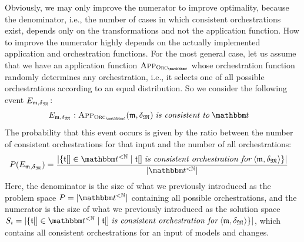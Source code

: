 Obviously, we may only improve the numerator to improve optimality, because the denominator, i.e., the number of cases in which consistent orchestrations exist, depends only on the transformations and not the application function.
How to improve the numerator highly depends on the actually implemented application and orchestration functions.
For the most general case, let us assume that we have an application function $\appfunction{\orcfunction{\transformationset{T}}}$ whose orchestration function randomly determines any orchestration, i.e., it selects one of all possible orchestrations according to an equal distribution.
So we consider the following event $E_{\modeltuple{m},\changetuple{\metamodeltuple{M}}}$:
\begin{align*}
    &
    E_{\modeltuple{m},\changetuple{\metamodeltuple{M}}}: \appfunction{\orcfunction{\transformationset{T}}}(\modeltuple{m}, \changetuple{\metamodeltuple{M}}) \mathtextspacearound{is consistent to} \transformationset{T}
\end{align*}
The probability that this event occurs is given by the ratio between the number of consistent orchestrations for that input and the number of all orchestrations:
\begin{align*}
    &
    P(E_{\modeltuple{m},\changetuple{\metamodeltuple{M}}}) = \frac{
        \abs{\setted{\sequence{\transformation{t}} \in \transformationset{T}^{< \mathbb{N}} \mid \sequence{\transformation{t}} \mathtextspacearound{is consistent orchestration for} \tupled{\modeltuple{m}, \changetuple{\metamodeltuple{M}}}}}
    }{
        \abs{\transformationset{T}^{< \mathbb{N}}}
    }
\end{align*}
Here, the denominator is the size of what we previously introduced as the problem space $P = \abs{\transformationset{T}^{< \mathbb{N}}}$ containing all possible orchestrations, and the numerator is the size of what we previously introduced as the solution space $S_{i} = \abs{\setted{\sequence{\transformation{t}} \in \transformationset{T}^{< \mathbb{N}} \mid \sequence{\transformation{t}} \mathtextspacearound{is consistent orchestration for} \tupled{\modeltuple{m}, \changetuple{\metamodeltuple{M}}}}}$, which contains all consistent orchestrations for an input of models and changes.

